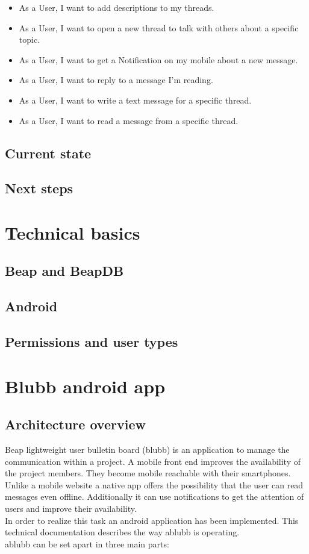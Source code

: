 \documentclass[12pt,a4paper,oneside]{report}
\newcommand{\appname}{ablubb}
\newcommand{\blubb}{blubb}
\begin{document}
\begin{itemize}
     \item As a User, I want to add descriptions to my threads.
     \item As a User, I want to open a new thread to talk with others about a specific topic.
     \item As a User, I want to get a Notification on my mobile about a new message.
     \item As a User, I want to reply to a message I'm reading.
     \item As a User, I want to write a text message for a specific thread.
     \item As a User, I want to read a message from a specific thread. 
   \end{itemize}
\section{Current state}

\section{Next steps}

\chapter{Technical basics}

\section{Beap and BeapDB}

\section{Android}

\section{Permissions and user types}

\chapter{Blubb android app}


\section{Architecture overview}
 Beap lightweight user bulletin board (\blubb{}) is an application to manage the communication within a project. A mobile front end improves the availability of the project members. They become mobile reachable with their smartphones. Unlike a mobile website a native app offers the possibility that the user can read messages even offline. Additionally it can use notifications to get the attention of users and improve their availability. \\
In order to realize this task an android application has been implemented. This technical documentation describes the way  \appname{} is operating.\\
\appname{} can be set apart in three main parts: 
\end{document}
